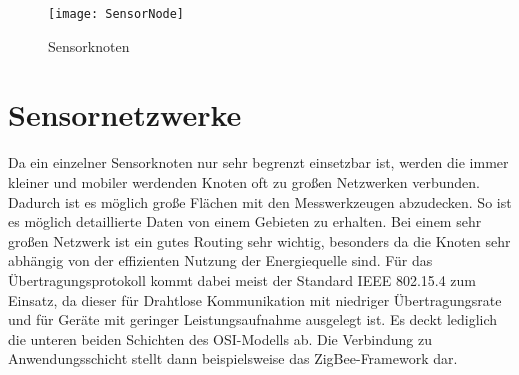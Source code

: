 \begin{figure}[htbp]
\centering
\caption{Sensorknoten}
\label{fig:sensornode}
\texttt{[image: SensorNode]}
\end{figure}

\section{Sensornetzwerke}

Da ein einzelner Sensorknoten nur sehr begrenzt einsetzbar ist, werden die immer kleiner und mobiler werdenden Knoten oft zu großen Netzwerken verbunden. Dadurch ist es möglich große Flächen mit den Messwerkzeugen abzudecken. So ist es möglich detaillierte Daten von einem Gebieten zu erhalten.\newline
Bei einem sehr großen Netzwerk ist ein gutes Routing sehr wichtig, besonders da die Knoten sehr abhängig von der effizienten Nutzung der Energiequelle sind. Für das Übertragungsprotokoll kommt dabei meist der Standard IEEE 802.15.4 zum Einsatz, da dieser für Drahtlose Kommunikation mit niedriger Übertragungsrate und für Geräte mit geringer Leistungsaufnahme ausgelegt ist. Es deckt lediglich die unteren beiden Schichten des OSI-Modells ab.\newline
Die Verbindung zu Anwendungsschicht stellt dann beispielsweise das ZigBee-Framework dar. 